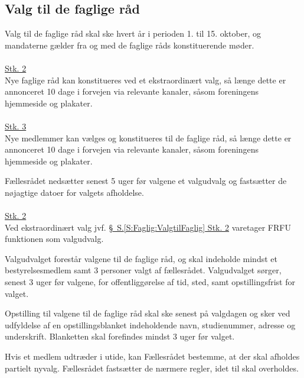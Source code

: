 \begin{list}
\subsection{Valg til de faglige råd}
\label{S:kap:valgtilfagligraad}
\item \label{S:Faglig:ValgtilFaglig} Valg til de faglige råd skal ske hvert år i perioden 1. til 15. oktober, og mandaterne gælder fra og med de faglige råds konstituerende møder.\\
\\
\underline{Stk. 2} \\
Nye faglige råd kan konstitueres ved et ekstraordinært valg, så længe dette er annonceret 10 dage i forvejen via relevante kanaler, såsom foreningens hjemmeside og plakater.\\
\\
\underline{Stk. 3} 
\\
Nye medlemmer kan vælges og konstitueres til de faglige råd, så længe dette er annonceret 10 dage i forvejen via relevante kanaler, såsom foreningens hjemmeside og plakater.\\

\item \label{S:Faglig:Valgudvalg} Fællesrådet nedsætter senest 5 uger før valgene et valgudvalg og fastsætter de nøjagtige datoer for valgets afholdelse.\\
\\
\underline{Stk. 2}\\
Ved ekstraordinært valg jvf. \hyperref[S:Faglig:ValgtilFaglig]{\S \ S.\ref*{S:Faglig:ValgtilFaglig} Stk. 2} varetager FRFU funktionen som valgudvalg.\\

\item Valgudvalget forestår valgene til de faglige råd, og skal indeholde mindst et bestyrelsesmedlem samt 3 personer valgt af fællesrådet. Valgudvalget sørger, senest 3 uger før valgene, for offentliggørelse af tid, sted, samt opstillingsfrist for valget.

\item \label{S:Faglig:Blanket} Opstilling til valgene til de faglige råd skal ske senest på valgdagen og sker ved udfyldelse af en opstillingsblanket indeholdende navn, studienummer, adresse og underskrift. Blanketten skal forefindes mindst 3 uger før valget.

\item Hvis et medlem udtræder i utide, kan Fællesrådet bestemme, at der skal afholdes partielt nyvalg. Fællesrådet fastsætter de nærmere regler, idet  til  skal overholdes.\\


\end{list}
